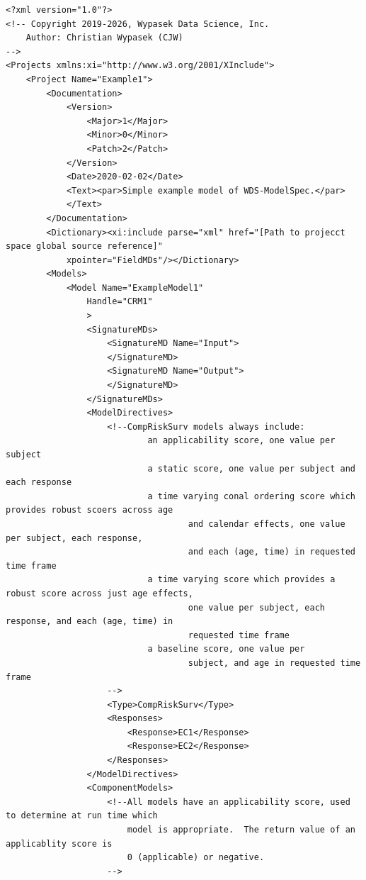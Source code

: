 \documentclass[10pt]{article}
\begin{document}
\begin{Verbatim}[fontsize=\small,baselinestretch=0.75,formatcom=\color{red}]
<?xml version="1.0"?>
<!-- Copyright 2019-2026, Wypasek Data Science, Inc.
    Author: Christian Wypasek (CJW)
-->
<Projects xmlns:xi="http://www.w3.org/2001/XInclude">
    <Project Name="Example1">
        <Documentation>
            <Version>
                <Major>1</Major>
                <Minor>0</Minor>
                <Patch>2</Patch>
            </Version>
            <Date>2020-02-02</Date>
            <Text><par>Simple example model of WDS-ModelSpec.</par>
            </Text>
        </Documentation>
        <Dictionary><xi:include parse="xml" href="[Path to projecct space global source reference]"  
            xpointer="FieldMDs"/></Dictionary>
        <Models>
            <Model Name="ExampleModel1" 
                Handle="CRM1"
                >
                <SignatureMDs>
                    <SignatureMD Name="Input">
                    </SignatureMD>
                    <SignatureMD Name="Output">
                    </SignatureMD>
                </SignatureMDs>
                <ModelDirectives>
                    <!--CompRiskSurv models always include:
                            an applicability score, one value per subject
                            a static score, one value per subject and each response
                            a time varying conal ordering score which provides robust scoers across age 
                                    and calendar effects, one value per subject, each response, 
                                    and each (age, time) in requested time frame
                            a time varying score which provides a robust score across just age effects, 
                                    one value per subject, each response, and each (age, time) in 
                                    requested time frame
                            a baseline score, one value per
                                    subject, and age in requested time frame
                    -->
                    <Type>CompRiskSurv</Type>
                    <Responses>
                        <Response>EC1</Response>
                        <Response>EC2</Response>
                    </Responses>
                </ModelDirectives>
                <ComponentModels>
                    <!--All models have an applicability score, used to determine at run time which 
                        model is appropriate.  The return value of an applicablity score is 
                        0 (applicable) or negative.
                    -->

\end{Verbatim}
\end{document}
